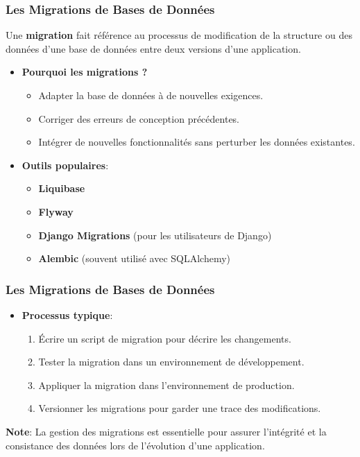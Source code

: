 \begin{frame}
  \frametitle{Les Migrations de Bases de Données}

  Une \textbf{migration} fait référence au processus de modification de la structure ou des données d'une base de données entre deux versions d'une application.

  \begin{itemize}
    \item \textbf{Pourquoi les migrations ?}
      \begin{itemize}
        \item Adapter la base de données à de nouvelles exigences.
        \item Corriger des erreurs de conception précédentes.
        \item Intégrer de nouvelles fonctionnalités sans perturber les données existantes.
      \end{itemize}

    \item \textbf{Outils populaires}:
      \begin{itemize}
        \item \textbf{Liquibase}
        \item \textbf{Flyway}
        \item \textbf{Django Migrations} (pour les utilisateurs de Django)
        \item \textbf{Alembic} (souvent utilisé avec SQLAlchemy)
      \end{itemize}

  \end{itemize}

\end{frame}

\begin{frame}
  \frametitle{Les Migrations de Bases de Données}
  \begin{itemize}
    \item \textbf{Processus typique}:
      \begin{enumerate}
        \item Écrire un script de migration pour décrire les changements.
        \item Tester la migration dans un environnement de développement.
        \item Appliquer la migration dans l'environnement de production.
        \item Versionner les migrations pour garder une trace des modifications.
      \end{enumerate}

  \end{itemize}

  \textbf{Note}: La gestion des migrations est essentielle pour assurer l'intégrité et la consistance des données lors de l'évolution d'une application.

\end{frame}
